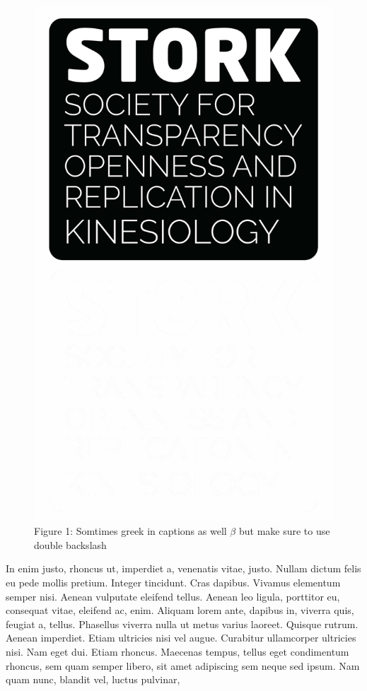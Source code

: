 \documentclass[]{cik}%
\begin{document}
\begin{figure}[H]
\includegraphics[width=1\linewidth]{STORK_overlay_blk} \caption{Figure 1: Somtimes greek in captions as well $\beta$ but make sure to use double backslash}\label{fig:fig1pdf}
\end{figure}

In enim justo, rhoncus ut, imperdiet a, venenatis vitae, justo. Nullam
dictum felis eu pede mollis pretium. Integer tincidunt. Cras dapibus.
Vivamus elementum semper nisi. Aenean vulputate eleifend tellus. Aenean
leo ligula, porttitor eu, consequat vitae, eleifend ac, enim. Aliquam
lorem ante, dapibus in, viverra quis, feugiat a, tellus. Phasellus
viverra nulla ut metus varius laoreet. Quisque rutrum. Aenean imperdiet.
Etiam ultricies nisi vel augue. Curabitur ullamcorper ultricies nisi.
Nam eget dui. Etiam rhoncus. Maecenas tempus, tellus eget condimentum
rhoncus, sem quam semper libero, sit amet adipiscing sem neque sed
ipsum. Nam quam nunc, blandit vel, luctus pulvinar,
\end{document}
